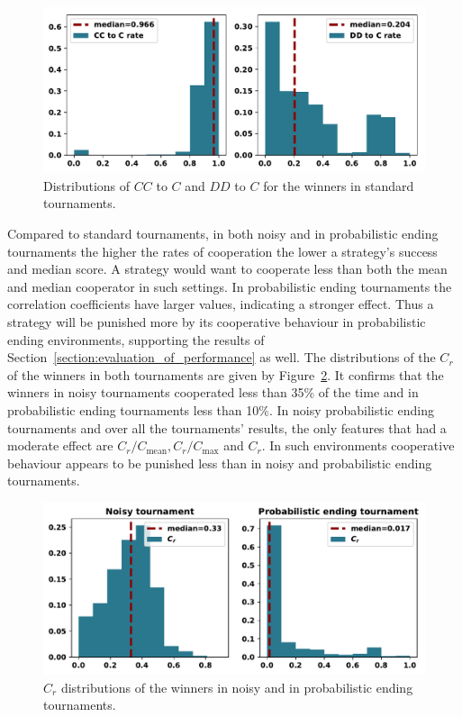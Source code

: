 \documentclass{article}
\begin{document}
\begin{figure}[!htbp]
    \centering
    \includegraphics[width=.8\textwidth]{../images/rates_of_winners_in_standard_tournaments.pdf}
    \caption{Distributions of $CC$ to $C$ and $DD$ to $C$ for the winners in
    standard tournaments.}\label{fig:rates_of_winners_in_standard_tournaments}
\end{figure}

Compared to standard tournaments, in both noisy and in probabilistic ending
tournaments the higher the rates of cooperation the lower a strategy's success
and median score. A strategy would want to cooperate less than both
the mean and median cooperator in such settings. In probabilistic ending
tournaments the correlation coefficients have larger values, indicating a
stronger effect. Thus a strategy will be punished more by its cooperative
behaviour in probabilistic ending environments, supporting the results of
Section~\ref{section:evaluation_of_performance}
as well. The distributions of the $C_r$ of the winners in
both tournaments are given by Figure~\ref{fig:c_r_distributions}. It confirms
that the winners in noisy tournaments cooperated less than 35\% of the time
and in probabilistic ending tournaments less than 10\%.
In noisy probabilistic ending tournaments and over all the tournaments' results,
the only features that had a moderate effect are $C_r/C_{\text{mean}},
C_r/C_{\text{max}}$ and $C_r$. In such environments cooperative behaviour
appears to be punished less than in noisy and probabilistic ending
tournaments.


\begin{figure}[!htbp]
    \centering
    \includegraphics[width=.8\textwidth]{../images/c_r_winners_tournaments.pdf}
    \caption{$C_r$ distributions of the winners in noisy and in probabilistic
    ending tournaments.}\label{fig:c_r_distributions}
\end{figure}
\end{document}
